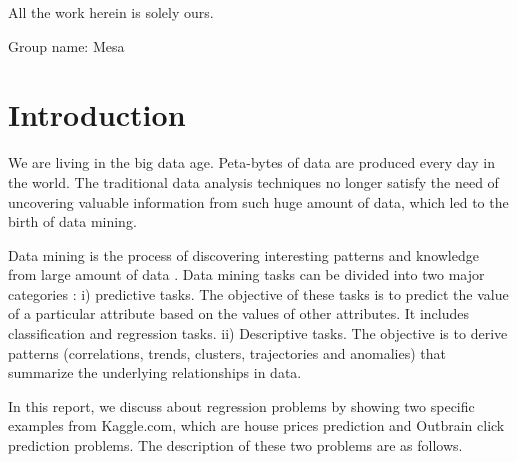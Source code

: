 \documentclass[fleqn,10pt]{SelfArx} %
\affiliation{\textsuperscript{1}\textit{Computer Science, School of Informatics and Computing, Indiana University, Bloomington, IN, USA}} %
\affiliation{*\textbf{Corresponding author}: li526@indiana.edu} %
\begin{document}
\flushbottom %

\maketitle %

All the work herein is solely ours.

Group name: Mesa

\tableofcontents %

\thispagestyle{empty} %


\section*{Introduction} %

  
We are living in the big data age. Peta-bytes of data are produced every day in the world. The traditional data analysis techniques no longer satisfy the need of uncovering valuable information from such huge amount of data, which led to the birth of data mining.

Data mining is the process of discovering interesting patterns and knowledge from large amount of data \cite{han2011data}. Data mining tasks can be divided into two major categories \cite{pang2006introduction}: i) predictive tasks. The objective of these tasks is to predict the value of a particular attribute based on the values of other attributes. It includes classification and regression tasks. ii) Descriptive tasks. The objective is to derive patterns (correlations, trends, clusters, trajectories and anomalies) that summarize the underlying relationships in data.

In this report, we discuss about regression problems by showing two specific examples from Kaggle.com,  which are house prices prediction\cite{kaggle:house}  and Outbrain click prediction\cite{kaggle:outbrain}  problems. The description of these two problems are as follows.
  
\end{document}
